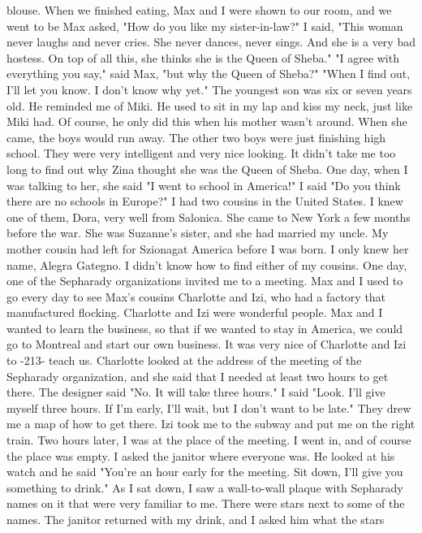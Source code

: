 blouse. When we finished eating, Max and I were shown to our room, and we went to be 
Max asked, "How do you like my sister-in-law?" 
I said, "This woman never laughs and never cries. She never dances, never sings. 
And she is a very bad hostess. On top of all this, she thinks she is the Queen of 
Sheba." 
"I agree with everything you say," said Max, "but why the Queen of Sheba?" 
"When I find out, I'll let you know. I don't know why yet." 
The youngest son was six or seven years old. He reminded me of Miki. He used to 
sit in my lap and kiss my neck, just like Miki had. Of course, he only did this when 
his mother wasn't around. When she came, the boys would run away. The other two 
boys were just finishing high school. They were very intelligent and very nice looking. 
It didn't take me too long to find out why Zina thought she was the Queen of Sheba. 
One day, when I was talking to her, she said "I went to school in America!" 
I said "Do you think there are no schools in Europe?" 
I had two cousins in the United States. I knew one of them, Dora, very well from 
Salonica. She came to New York a few months before the war. She was Suzanne's 
sister, and she had married my uncle. My mother cousin had left for Szionagat America 
before I was born. I only knew her name, Alegra Gategno. I didn't know how to find 
either of my cousins. 
One day, one of the Sepharady organizations invited me to a meeting. Max and I 
used to go every day to see Max's cousins Charlotte and Izi, who had a factory that 
manufactured flocking. Charlotte and Izi were wonderful people. Max and I wanted to 
learn the business, so that if we wanted to stay in America, we could go to Montreal and start our own business. It was very nice of Charlotte and Izi to 
-213- 
teach us. 
Charlotte looked at the address of the meeting of the Sepharady organization, 
and she said that I needed at least two hours to get there. The designer said "No. It 
will take three hours." I said "Look. I’ll give myself three hours. If I’m early, 
I’ll wait, but I don’t want to be late." They drew me a map of how to get there. Izi 
took me to the subway and put me on the right train. Two hours later, I was at the place 
of the meeting. I went in, and of course the place was empty. I asked the janitor 
where everyone was. 
He looked at his watch and he said "You're an hour early for the meeting. Sit 
down, I'll give you something to drink." As I sat down, I saw a wall-to-wall plaque 
with Sepharady names on it that were very familiar to me. There were stars next to 
some of the names. The janitor returned with my drink, and I asked him what the stars 
